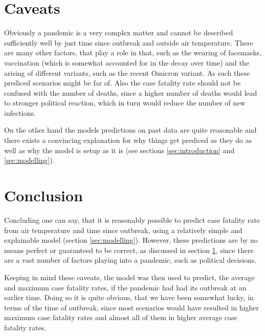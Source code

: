 \documentclass{article}
\begin{document}
\section{Caveats}
\label{sec:caveats}

Obviously a pandemic is a very complex matter and cannot be described sufficiently well by just time since outbreak and outside air temperature. There are many other factors, that play a role in that, such as the wearing of facemasks, vaccination (which is somewhat accounted for in the decay over time) and the arising of different variants, such as the recent Omicron variant. As such these prediced scenarios might be far of. Also the case fatality rate should not be confused with the number of deaths, since a higher number of deaths would lead to stronger political reaction, which in turn would reduce the number of new infections. 

On the other hand the models predictions on past data are quite reasonable and there exists a convincing explanation for why things get prediced as they do as well as why the model is setup as it is (see sections \ref{sec:introduction} and \ref{sec:modelling}).

\section{Conclusion}

Concluding one can say, that it is reasonably possible to predict case fatality rate from air temperature and time since outbreak, using a relatively simple and explainable model (section \ref{sec:modelling}). However, these predictions are by no means perfect or guaranteed to be correct, as discussed in section \ref{sec:caveats}, since there are a vast number of factors playing into a pandemic, such as political decisions. 

Keeping in mind these caveats, the model was then used to predict, the average and maximum case fatality rates, if the pandemic had had its outbreak at an earlier time. Doing so it is quite obvious, that we have been somewhat lucky, in terms of the time of outbreak, since most scenarios would have resulted in higher maximum case fatality rates and almost all of them in higher average case fatality rates. 




\end{document}
